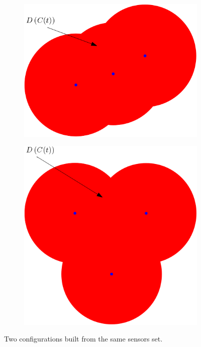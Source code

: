 \documentclass{iacas}
\begin{document}
\begin{figure}[H]
\centering
	\begin{subfigure}[b]{0.3\textwidth}
		\includegraphics[width=\textwidth]{figures/problem-def/config-1.png}
	\end{subfigure}
	\hspace{0.75cm}
	\vline
	\hspace{0.75cm}
	\begin{subfigure}[b]{0.3\textwidth}
		\includegraphics[width=\textwidth]{figures/problem-def/config-2.png}
	\end{subfigure}
	\caption{Two configurations built from the same sensors set.}
	\label{fig:configurations Example}
\end{figure}
\end{document}
